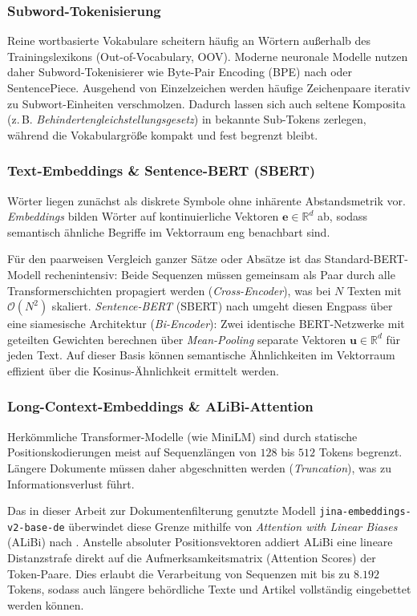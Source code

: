 \subsubsection{Subword-Tokenisierung}
Reine wortbasierte Vokabulare scheitern häufig an Wörtern außerhalb des Trainingslexikons (Out-of-Vocabulary, OOV). Moderne neuronale Modelle nutzen daher Subword-Tokenisierer wie Byte-Pair Encoding (BPE) nach \citet{sennrich2016neural} oder SentencePiece. Ausgehend von Einzelzeichen werden häufige Zeichenpaare iterativ zu Subwort-Einheiten verschmolzen. Dadurch lassen sich auch seltene Komposita (z.\,B. \textit{Behindertengleichstellungsgesetz}) in bekannte Sub-Tokens zerlegen, während die Vokabulargröße kompakt und fest begrenzt bleibt.

\subsubsection{Text-Embeddings \& Sentence-BERT (SBERT)}
Wörter liegen zunächst als diskrete Symbole ohne inhärente Abstandsmetrik vor. \textit{Embeddings} bilden Wörter auf kontinuierliche Vektoren $\mathbf{e} \in \mathbb{R}^d$ ab, sodass semantisch ähnliche Begriffe im Vektorraum eng benachbart sind.

Für den paarweisen Vergleich ganzer Sätze oder Absätze ist das Standard-BERT-Modell \citep{devlin2019bert} rechenintensiv: Beide Sequenzen müssen gemeinsam als Paar durch alle Transformerschichten propagiert werden (\textit{Cross-Encoder}), was bei $N$ Texten mit $\mathcal{O}(N^2)$ skaliert. \textit{Sentence-BERT} (SBERT) nach \citet{reimers2019sentence} umgeht diesen Engpass über eine siamesische Architektur (\textit{Bi-Encoder}): Zwei identische BERT-Netzwerke mit geteilten Gewichten berechnen über \textit{Mean-Pooling} separate Vektoren $\mathbf{u} \in \mathbb{R}^d$ für jeden Text. Auf dieser Basis können semantische Ähnlichkeiten im Vektorraum effizient über die Kosinus-Ähnlichkeit ermittelt werden.

\subsubsection{Long-Context-Embeddings \& ALiBi-Attention}
Herkömmliche Transformer-Modelle (wie MiniLM) sind durch statische Positionskodierungen meist auf Sequenzlängen von $128$ bis $512$ Tokens begrenzt. Längere Dokumente müssen daher abgeschnitten werden (\textit{Truncation}), was zu Informationsverlust führt.

Das in dieser Arbeit zur Dokumentenfilterung genutzte Modell \texttt{jina-embeddings-v2-base-de} \citep{gunther2023jina} überwindet diese Grenze mithilfe von \textit{Attention with Linear Biases} (ALiBi) nach \citet{press2021train}. Anstelle absoluter Positionsvektoren addiert ALiBi eine lineare Distanzstrafe direkt auf die Aufmerksamkeitsmatrix (Attention Scores) der Token-Paare. Dies erlaubt die Verarbeitung von Sequenzen mit bis zu $8.192$ Tokens, sodass auch längere behördliche Texte und Artikel vollständig eingebettet werden können.

